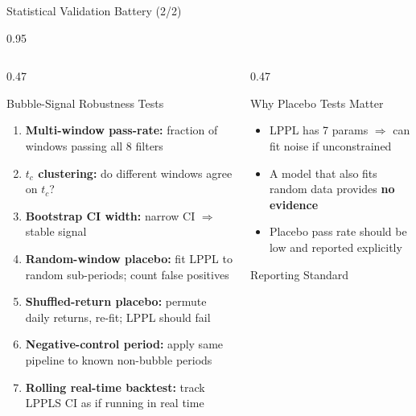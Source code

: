 \documentclass[9pt, aspectratio=169, t]{beamer}
\begin{document}
\begin{frame}{Statistical Validation Battery (2/2)}
    \begin{cminipage}{0.95\textwidth}
    {\scriptsize
    \begin{columns}[T]
        \begin{column}{0.47\textwidth}
            \begin{block}{Bubble-Signal Robustness Tests}
                \begin{enumerate}\setlength{\itemsep}{0pt}
                    \item \textbf{Multi-window pass-rate:} fraction of windows passing all 8 filters
                    \item \textbf{$t_c$ clustering:} do different windows agree on $t_c$?
                    \item \textbf{Bootstrap CI width:} narrow CI $\Rightarrow$ stable signal
                    \item \textbf{Random-window placebo:} fit LPPL to random sub-periods; count false positives
                    \item \textbf{Shuffled-return placebo:} permute daily returns, re-fit; LPPL should fail
                    \item \textbf{Negative-control period:} apply same pipeline to known non-bubble periods
                    \item \textbf{Rolling real-time backtest:} track LPPLS CI as if running in real time
                \end{enumerate}
            \end{block}
        \end{column}
        \begin{column}{0.47\textwidth}
            \begin{alertblock}{Why Placebo Tests Matter}
                \begin{itemize}\setlength{\itemsep}{0pt}
                    \item LPPL has 7 params $\Rightarrow$ can fit noise if unconstrained
                    \item A model that also fits random data provides \textbf{no evidence}
                    \item Placebo pass rate should be low and reported explicitly
                \end{itemize}
            \end{alertblock}
            \vspace{-2mm}
            \begin{exampleblock}{Reporting Standard}

\end{exampleblock}
\end{column}
\end{columns}}
\end{cminipage}
\end{frame}
\end{document}
